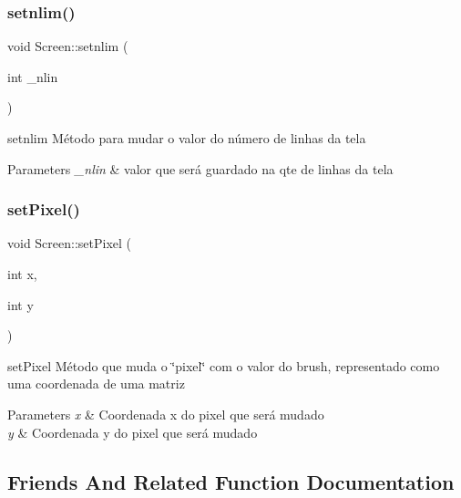 \subsubsection{\texorpdfstring{setnlim()}{setnlim()}}
{\footnotesize\ttfamily void Screen\+::setnlim (\begin{DoxyParamCaption}\item[{int}]{\+\_\+nlin }\end{DoxyParamCaption})}



setnlim Método para mudar o valor do número de linhas da tela 


\begin{DoxyParams}{Parameters}
{\em \+\_\+nlin} & valor que será guardado na qte de linhas da tela \\
\hline
\end{DoxyParams}
\mbox{\label{class_screen_ae6bea81c57a22d226507c3c26fa95ee0}} 
\subsubsection{\texorpdfstring{set\+Pixel()}{setPixel()}}
{\footnotesize\ttfamily void Screen\+::set\+Pixel (\begin{DoxyParamCaption}\item[{int}]{x,  }\item[{int}]{y }\end{DoxyParamCaption})}



set\+Pixel Método que muda o \char`\"{}pixel\char`\"{} com o valor do \textquotesingle{}brush\textquotesingle{}, representado como uma coordenada de uma matriz 


\begin{DoxyParams}{Parameters}
{\em x} & Coordenada x do pixel que será mudado \\
\hline
{\em y} & Coordenada y do pixel que será mudado \\
\hline
\end{DoxyParams}


\subsection{Friends And Related Function Documentation}
\mbox{\label{class_screen_aab6a2880746bfe1b7964817cc8f0989e}} 
